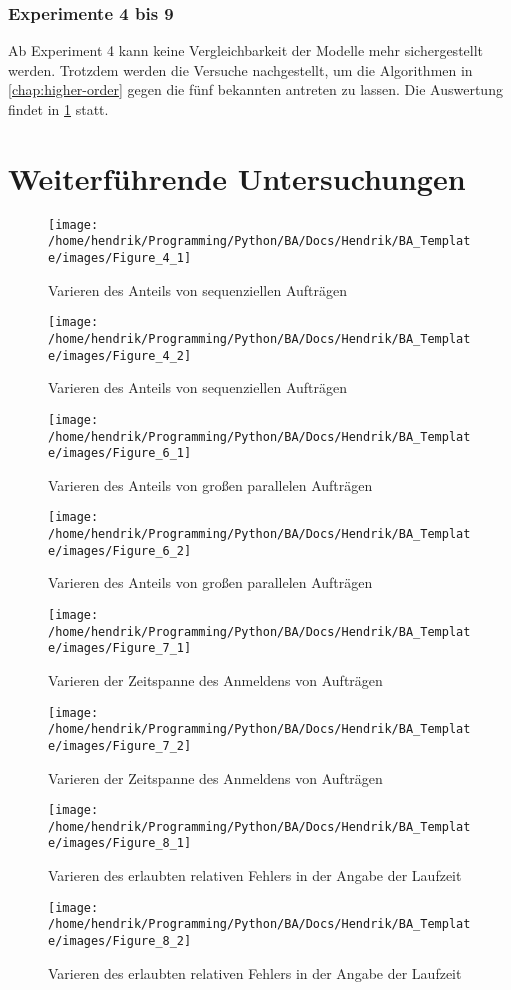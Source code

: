 \FloatBarrier

\subsubsection{Experimente 4 bis 9}
Ab Experiment 4 kann keine Vergleichbarkeit der Modelle mehr sichergestellt werden. Trotzdem werden die Versuche nachgestellt, um die Algorithmen in \ref{chap:higher-order} gegen die fünf bekannten antreten zu lassen. Die Auswertung findet in \ref{weiter} statt.


\section{Weiterführende Untersuchungen}
\label{weiter}

\begin{figure}	
	\texttt{[image: /home/hendrik/Programming/Python/BA/Docs/Hendrik/BA\_Template/images/Figure\_4\_1]}
	\caption{Varieren des Anteils von sequenziellen Aufträgen}
	\label{figure_4_1}
\end{figure}
\begin{figure}	
	\texttt{[image: /home/hendrik/Programming/Python/BA/Docs/Hendrik/BA\_Template/images/Figure\_4\_2]}
	\caption{Varieren des Anteils von sequenziellen Aufträgen}
	\label{figure_4_2}
\end{figure}
\begin{figure}	
	\texttt{[image: /home/hendrik/Programming/Python/BA/Docs/Hendrik/BA\_Template/images/Figure\_6\_1]}
	\caption{Varieren des Anteils von großen parallelen Aufträgen}
	\label{figure_6_1}
\end{figure}
\begin{figure}	
	\texttt{[image: /home/hendrik/Programming/Python/BA/Docs/Hendrik/BA\_Template/images/Figure\_6\_2]}
	\caption{Varieren des Anteils von großen parallelen Aufträgen}
	\label{figure_6_2}
\end{figure}
\begin{figure}	
	\texttt{[image: /home/hendrik/Programming/Python/BA/Docs/Hendrik/BA\_Template/images/Figure\_7\_1]}
	\caption{Varieren der Zeitspanne des Anmeldens von Aufträgen}
	\label{figure_7_1}
\end{figure}
\begin{figure}	
	\texttt{[image: /home/hendrik/Programming/Python/BA/Docs/Hendrik/BA\_Template/images/Figure\_7\_2]}
	\caption{Varieren der Zeitspanne des Anmeldens von Aufträgen}
	\label{figure_7_2}
\end{figure}
\begin{figure}	
	\texttt{[image: /home/hendrik/Programming/Python/BA/Docs/Hendrik/BA\_Template/images/Figure\_8\_1]}
	\caption{Varieren des erlaubten relativen Fehlers in der Angabe der Laufzeit}
	\label{figure_8_1}
\end{figure}
\begin{figure}	
	\texttt{[image: /home/hendrik/Programming/Python/BA/Docs/Hendrik/BA\_Template/images/Figure\_8\_2]}
	\caption{Varieren des erlaubten relativen Fehlers in der Angabe der Laufzeit}
	\label{figure_8_2}
\end{figure}


